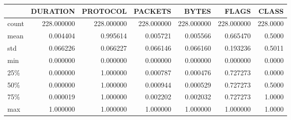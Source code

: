 \begin{tabular}{lrrrrrr}
\toprule
{} &    DURATION &    PROTOCOL &     PACKETS &       BYTES &       FLAGS &     CLASS \\
\midrule
count &  228.000000 &  228.000000 &  228.000000 &  228.000000 &  228.000000 &  228.0000 \\
mean  &    0.004404 &    0.995614 &    0.005721 &    0.005566 &    0.665470 &    0.5000 \\
std   &    0.066226 &    0.066227 &    0.066146 &    0.066160 &    0.193236 &    0.5011 \\
min   &    0.000000 &    0.000000 &    0.000000 &    0.000000 &    0.000000 &    0.0000 \\
25\%   &    0.000000 &    1.000000 &    0.000787 &    0.000476 &    0.727273 &    0.0000 \\
50\%   &    0.000000 &    1.000000 &    0.000944 &    0.000529 &    0.727273 &    0.5000 \\
75\%   &    0.000019 &    1.000000 &    0.002202 &    0.002032 &    0.727273 &    1.0000 \\
max   &    1.000000 &    1.000000 &    1.000000 &    1.000000 &    1.000000 &    1.0000 \\
\bottomrule
\end{tabular}
